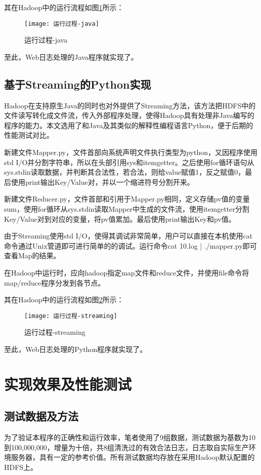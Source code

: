 其在Hadoop中的运行流程如图\ref{fig:运行过程-java}所示：

\begin{figure}[h]
 \centering
 \texttt{[image: 运行过程-java]}
 \caption{运行过程-java}
 \label{fig:运行过程-java}
\end{figure}

至此，Web日志处理的Java程序就实现了。

\subsection{基于Streaming的Python实现}
Hadoop在支持原生Java的同时也对外提供了Streaming方法，该方法把HDFS中的文件读写转化成文件流，传入外部程序处理，使得Hadoop具有处理非Java编写的程序的能力。本文选用了和Java及其类似的解释性编程语言Python，便于后期的性能测试对比。

新建文件Mapper.py，文件首部向系统声明文件执行类型为python，又因程序使用std I/O并分割字符串，所以在头部引用sys和itemgetter。之后使用for循环语句从sys.stdin读取数据，并判断其合法性，若合法，则给value赋值1，反之赋值0，最后使用print输出Key/Value对，并以一个缩进符号分割开来。

新建文件Reducer.py，文件首部和引用于Mapper.py相同，定义存储pv值的变量sum，使用for循环从sys.stdin读取Mapper中生成的文件流，使用itemgetter分割Key/Value对到对应的变量，将pv值累加。最后使用print输出Key和pv值。

由于Streaming使用std I/O，使得其调试非常简单，用户可以直接在本机使用cat命令通过Unix管道即可进行简单的的调试。运行命令cat 10.log | ./mapper.py即可查看Map的结果。

在Hadoop中运行时，应向hadoop指定map文件和reduce文件，并使用file命令将map/reduce程序分发到各节点。

其在Hadoop中的运行流程如图\ref{fig:运行过程-streaming}所示：

\begin{figure}[h]
 \centering
 \texttt{[image: 运行过程-streaming]}
 \caption{运行过程-streaming}
 \label{fig:运行过程-streaming}
\end{figure}


至此，Web日志处理的Python程序就实现了。

\section{实现效果及性能测试}
\subsection{测试数据及方法}
为了验证本程序的正确性和运行效率，笔者使用了9组数据，测试数据为基数为10到100,000,000，增量为十倍，共8组清洗过的有效合法日志，日志取自实际生产环境服务器，具有一定的参考价值。所有测试数据均存放在采用Hadoop默认配置的HDFS上。

